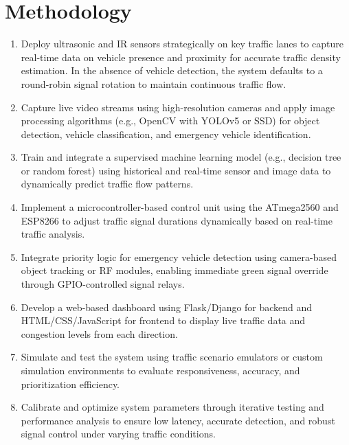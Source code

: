 \documentclass[12pt]{report}
\begin{document}
\section{Methodology}
\begin{enumerate}
\item Deploy ultrasonic and IR sensors strategically on key traffic lanes to capture real-time data on vehicle presence and proximity for accurate traffic density estimation. In the absence of vehicle detection, the system defaults to a round-robin signal rotation to maintain continuous traffic flow.

\item Capture live video streams using high-resolution cameras and apply image processing algorithms (e.g., OpenCV with YOLOv5 or SSD) for object detection, vehicle classification, and emergency vehicle identification.

\item Train and integrate a supervised machine learning model (e.g., decision tree or random forest) using historical and real-time sensor and image data to dynamically predict traffic flow patterns.

\item Implement a microcontroller-based control unit using the ATmega2560 and ESP8266 to adjust traffic signal durations dynamically based on real-time traffic analysis.

\item Integrate priority logic for emergency vehicle detection using camera-based object tracking or RF modules, enabling immediate green signal override through GPIO-controlled signal relays.

\item Develop a web-based dashboard using Flask/Django for backend and HTML/CSS/JavaScript for frontend to display live traffic data and congestion levels from each direction.

\item Simulate and test the system using traffic scenario emulators or custom simulation environments to evaluate responsiveness, accuracy, and prioritization efficiency.

\item Calibrate and optimize system parameters through iterative testing and performance analysis to ensure low latency, accurate detection, and robust signal control under varying traffic conditions.
\end{enumerate}
\end{document}
